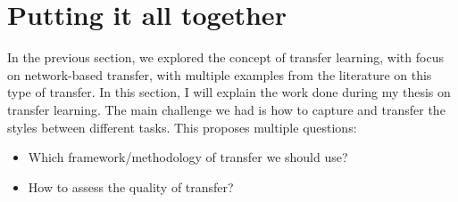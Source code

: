 
\section{Putting it all together}
  \par In the previous section, we explored the concept of transfer learning, with focus on network-based transfer, with multiple examples from the literature on this type of transfer. In this section, I will explain the work done during my thesis on transfer learning. The main challenge we had is how to capture and transfer the styles between different tasks. This proposes multiple questions:
  \begin{itemize}
    \item Which framework/methodology of transfer we should use?
    \item How to assess the quality of transfer?
  \end{itemize}

